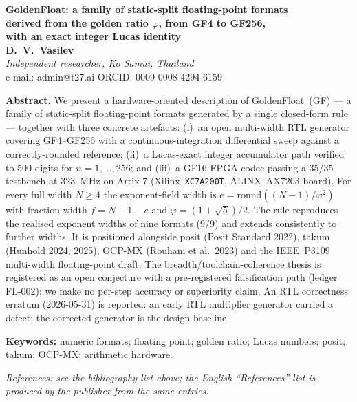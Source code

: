 \documentclass[11pt,a4paper]{article}
\theoremstyle{plain}
\begin{document}
\clearpage
{}
\begin{center}
{\large\textbf{GoldenFloat: a family of static-split floating-point formats\\
derived from the golden ratio \(\varphi\), from GF4 to GF256,\\
with an exact integer Lucas identity}}\\[6pt]
\textbf{D.~V.~Vasilev}\\[4pt]
\emph{Independent researcher, Ko Samui, Thailand}\\
e-mail: admin@t27.ai \quad ORCID: 0009-0008-4294-6159
\end{center}

\medskip
\noindent\textbf{Abstract.}
We present a hardware-oriented description of GoldenFloat~(GF) --- a family of
static-split floating-point formats generated by a single closed-form rule ---
together with three concrete artefacts: (i)~an open multi-width RTL generator
covering GF4--GF256 with a continuous-integration differential sweep against a
correctly-rounded reference; (ii)~a Lucas-exact integer accumulator path verified
to 500 digits for \(n = 1,\dots,256\); and (iii)~a GF16 FPGA codec passing a
35/35 testbench at 323~MHz on Artix-7 (Xilinx~\texttt{XC7A200T}, ALINX~AX7203 board). For every full width
\(N \ge 4\) the exponent-field width is \(e = \mathrm{round}((N-1)/\varphi^{2})\)
with fraction width \(f = N-1-e\) and \(\varphi = (1+\sqrt{5})/2\). The rule
reproduces the realised exponent widths of nine formats (9/9) and extends
consistently to further widths. It is positioned alongside posit (Posit
Standard 2022), takum (Hunhold 2024, 2025), OCP-MX (Rouhani et al.\ 2023) and
the IEEE~P3109 multi-width floating-point draft. The breadth/toolchain-coherence
thesis is registered as an open conjecture with a pre-registered falsification
path (ledger FL-002); we make no per-step accuracy or superiority claim. An RTL
correctness erratum (2026-05-31) is reported: an early RTL multiplier generator
carried a defect; the corrected generator is the design baseline.

\medskip
\noindent\textbf{Keywords:} numeric formats; floating point; golden ratio;
Lucas numbers; posit; takum; OCP-MX; arithmetic hardware.

\medskip
\noindent\emph{References: see the bibliography list above; the English
``References'' list is produced by the publisher from the same entries.}
\end{document}
